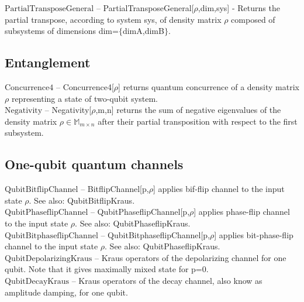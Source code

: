 \noindent\textbf{$ \text{PartialTransposeGeneral} $ }-- PartialTransposeGeneral[$\rho $,dim,sys] - Returns the partial transpose, according to system sys, of density matrix $\rho $ composed of subsystems of dimensions dim=$\{$dimA,dimB$\}$. $  $\\[6pt]

\subsection{Entanglement}

\noindent\textbf{$ \text{Concurrence4} $ }-- Concurrence4[$\rho $] returns quantum concurrence of a density matrix $\rho $ representing a state of two-qubit system.$  $\\[6pt]

\noindent\textbf{$ \text{Negativity} $ }-- Negativity[$\rho $,m,n] returns the sum of negative eigenvalues of the density matrix $\rho \in $$ \mathbb{M}_{m\times n} $ after their partial transposition with respect to the first subsystem.$  $\\[6pt]

\subsection{One-qubit quantum channels}

\noindent\textbf{$ \text{QubitBitflipChannel} $ }-- BitflipChannel[p,$\rho $] applies bif-flip channel to the input state $\rho $. See also: QubitBitflipKraus.$  $\\[6pt]

\noindent\textbf{$ \text{QubitPhaseflipChannel} $ }-- QubitPhaseflipChannel[p,$\rho $] applies phase-flip channel to the input state $\rho $. See also: QubitPhaseflipKraus.$  $\\[6pt]

\noindent\textbf{$ \text{QubitBitphaseflipChannel} $ }-- QubitBitphaseflipChannel[p,$\rho $] applies bit-phase-flip channel to the input state $\rho $. See also: QubitPhaseflipKraus.$  $\\[6pt]

\noindent\textbf{$ \text{QubitDepolarizingKraus} $ }-- Kraus operators of the depolarizing channel for one qubit. Note that it gives maximally mixed state for p=0.$  $\\[6pt]

\noindent\textbf{$ \text{QubitDecayKraus} $ }-- Kraus operators of the decay channel, also know as amplitude damping, for one qubit.$  $\\[6pt]

